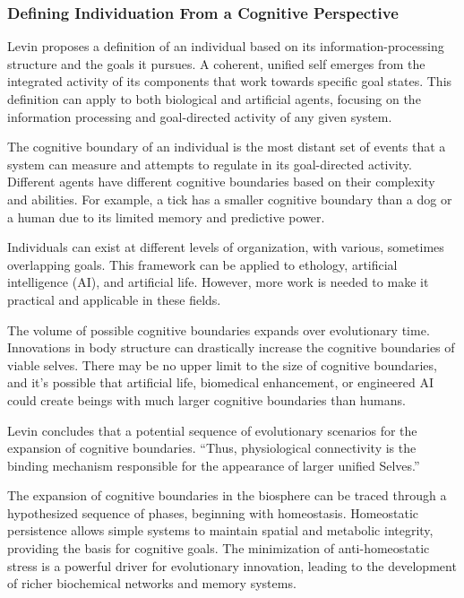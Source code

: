 \subsubsection{Defining Individuation From a Cognitive Perspective}


Levin proposes a definition of an individual based on its information-processing structure and the goals it pursues. A coherent, unified self emerges from the integrated activity of its components that work towards specific goal states. This definition can apply to both biological and artificial agents, focusing on the information processing and goal-directed activity of any given system.

The cognitive boundary of an individual is the most distant set of events that a system can measure and attempts to regulate in its goal-directed activity. Different agents have different cognitive boundaries based on their complexity and abilities. For example, a tick has a smaller cognitive boundary than a dog or a human due to its limited memory and predictive power.

Individuals can exist at different levels of organization, with various, sometimes overlapping goals. This framework can be applied to ethology, artificial intelligence (AI), and artificial life. However, more work is needed to make it practical and applicable in these fields.

The volume of possible cognitive boundaries expands over evolutionary time. Innovations in body structure can drastically increase the cognitive boundaries of viable selves. There may be no upper limit to the size of cognitive boundaries, and it's possible that artificial life, biomedical enhancement, or engineered AI could create beings with much larger cognitive boundaries than humans.

Levin concludes that a potential sequence of evolutionary scenarios for the expansion of cognitive boundaries.
“Thus, physiological connectivity is the binding mechanism responsible for the appearance of larger unified Selves.”

The expansion of cognitive boundaries in the biosphere can be traced through a hypothesized sequence of phases, beginning with homeostasis. Homeostatic persistence allows simple systems to maintain spatial and metabolic integrity, providing the basis for cognitive goals. The minimization of anti-homeostatic stress is a powerful driver for evolutionary innovation, leading to the development of richer biochemical networks and memory systems.

